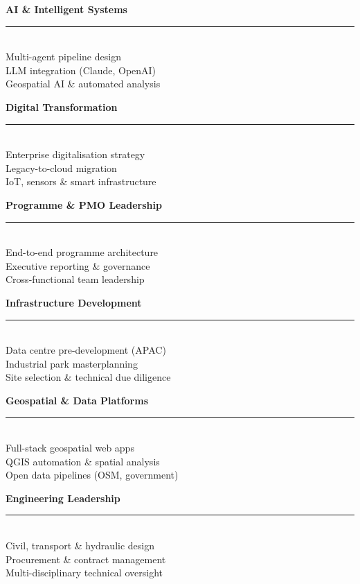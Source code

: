 \newcommand{\compbox}[4]{%
  \begin{minipage}[t]{0.3\textwidth}
    \vspace{0pt}
    \textcolor{Primary2}{\textbf{#1}}\\
    {\color{Primary2}\rule{\linewidth}{0.4pt}}\\[1pt]
    {\small\textcolor{Dark}{#2}\\[1pt] #3\\[1pt] #4}
  \end{minipage}%
}

\vspace{2mm}
\noindent
\compbox{AI \& Intelligent Systems}%
  {Multi-agent pipeline design}%
  {LLM integration (Claude, OpenAI)}%
  {Geospatial AI \& automated analysis}%
\hfill
\compbox{Digital Transformation}%
  {Enterprise digitalisation strategy}%
  {Legacy-to-cloud migration}%
  {IoT, sensors \& smart infrastructure}%
\hfill
\compbox{Programme \& PMO Leadership}%
  {End-to-end programme architecture}%
  {Executive reporting \& governance}%
  {Cross-functional team leadership}%

\vspace{4mm}
\noindent
\compbox{Infrastructure Development}%
  {Data centre pre-development (APAC)}%
  {Industrial park masterplanning}%
  {Site selection \& technical due diligence}%
\hfill
\compbox{Geospatial \& Data Platforms}%
  {Full-stack geospatial web apps}%
  {QGIS automation \& spatial analysis}%
  {Open data pipelines (OSM, government)}%
\hfill
\compbox{Engineering Leadership}%
  {Civil, transport \& hydraulic design}%
  {Procurement \& contract management}%
  {Multi-disciplinary technical oversight}%
\vspace{2mm}
